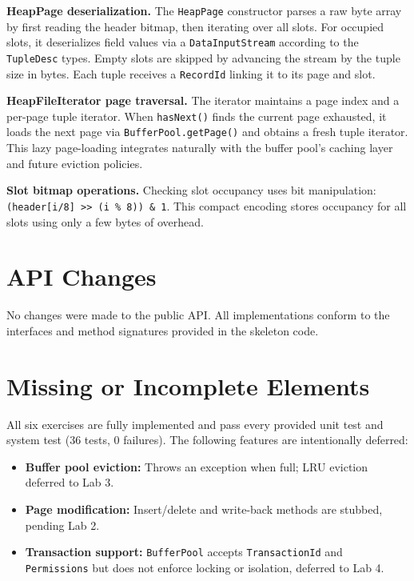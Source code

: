 \documentclass[11pt]{article}
\begin{document}
\textbf{HeapPage deserialization.} The \texttt{HeapPage} constructor parses a raw byte array by first reading the header bitmap, then iterating over all slots. For occupied slots, it deserializes field values via a \texttt{DataInputStream} according to the \texttt{TupleDesc} types. Empty slots are skipped by advancing the stream by the tuple size in bytes. Each tuple receives a \texttt{RecordId} linking it to its page and slot.

\textbf{HeapFileIterator page traversal.} The iterator maintains a page index and a per-page tuple iterator. When \texttt{hasNext()} finds the current page exhausted, it loads the next page via \texttt{BufferPool.getPage()} and obtains a fresh tuple iterator. This lazy page-loading integrates naturally with the buffer pool's caching layer and future eviction policies.

\textbf{Slot bitmap operations.} Checking slot occupancy uses bit manipulation: \texttt{(header[i/8] >> (i \% 8)) \& 1}. This compact encoding stores occupancy for all slots using only a few bytes of overhead.

\section{API Changes}

No changes were made to the public API. All implementations conform to the interfaces and method signatures provided in the skeleton code.

\section{Missing or Incomplete Elements}

All six exercises are fully implemented and pass every provided unit test and system test (36 tests, 0 failures). The following features are intentionally deferred:

\begin{itemize}[nosep]
    \item \textbf{Buffer pool eviction:} Throws an exception when full; LRU eviction deferred to Lab 3.
    \item \textbf{Page modification:} Insert/delete and write-back methods are stubbed, pending Lab 2.
    \item \textbf{Transaction support:} \texttt{BufferPool} accepts \texttt{TransactionId} and \texttt{Permissions} but does not enforce locking or isolation, deferred to Lab 4.
\end{itemize}
\end{document}
